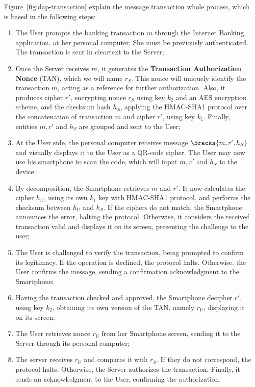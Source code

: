 Figure~\ref{fig:dap-transaction} explain the message transaction whole process, which is based in the following steps:

\begin{enumerate}
  \item The User prompts the banking transaction \(m\) through the Internet Banking application, at her personal computer. She must be previously authenticated. The transaction is sent in cleartext to the Server;

  \item Once the Server receives \(m\), it generates the \textbf{Transaction Authorization Nonce} (TAN), which we will name \(r_S\). This nonce will uniquely identify the transaction \(m\), acting as a reference for further authorization. Also, it produces cipher \(r'\), encrypting nonce \(r_S\) using key \(k_2\) and an AES encryption scheme, and the checksum hash \(h_S\), applying the HMAC-SHA1 protocol over the concatenation of transaction \(m\) and cipher \(r'\), using key \(k_1\). Finally, entities \(m, r'\) and \(h_S\) are grouped and sent to the User;

  \item At the User side, the personal computer receives message \(\Bracks{m, r', h_S}\) and visually displays it to the User as a QR-code cipher. The User may now use his smartphone to scan the code, which will input \(m, r'\) and \(h_S\) to the device;

  \item By decomposition, the Smartphone retrieves \(m\) and \(r'\). It now calculates the cipher \(h_U\), using its own \(k_1\) key with HMAC-SHA1 protocol, and performs the checksum between \(h_U\) and \(h_S\). If the ciphers do not match, the Smartphone announces the error, halting the protocol. Otherwise, it considers the received transaction valid and displays it on its screen, presenting the challenge to the user;

  \item The User is challenged to verify the transaction, being prompted to confirm its legitimacy. If the operation is declined, the protocol halts. Otherwise, the User confirms the message, sending a confirmation acknowledgment to the Smartphone;

  \item Having the transaction checked and approved, the Smartphone decipher \(r'\), using key \(k_2\), obtaining its own version of the TAN, namely \(r_U\), displaying it on its screen;

  \item The User retrieves nonce \(r_U\) from her Smartphone screen, sending it to the Server through its personal computer;

  \item The server receives \(r_U\) and compares it with \(r_S\). If they do not correspond, the protocol halts. Otherwise, the Server authorizes the transaction. Finally, it sends an acknowledgment to the User, confirming the authorization.
\end{enumerate}

